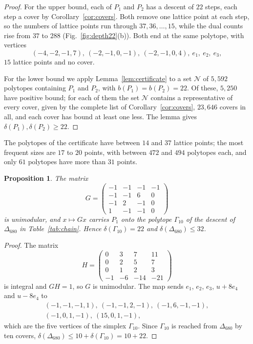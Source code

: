 \documentclass[manuscript]{aomart}
\newtheorem{proposition}[theorem]{Proposition}
\theoremstyle{definition}
\theoremstyle{remark}
\newcommand{\Dbig}{\Delta_{680}}
\begin{document}
\begin{proof}
For the upper bound, each of $P_1$ and $P_2$ has a descent of $22$ steps,
each step a cover by Corollary~\ref{cor:covers}. Both remove one lattice
point at each step, so the numbers of lattice points run through
$37,36,\dots,15$, while the dual counts rise from $37$ to $288$
(Fig.~\ref{fig:depth22}(b)). Both end at the same polytope, with vertices
\[
(-4,-2,-1,7),\ (-2,-1,0,-1),\ (-2,-1,0,4),\ e_1,\ e_2,\ e_3,
\]
$15$ lattice points and no cover.

For the lower bound we apply Lemma~\ref{lem:certificate} to a set
$\mathcal{N}$ of $5{,}592$ polytopes containing $P_1$ and $P_2$, with
$b(P_1)=b(P_2)=22$. Of these, $5{,}250$ have positive bound; for each of
them the set $\mathcal{N}$ contains a representative of every cover, given
by the complete list of Corollary~\ref{cor:covers}, $23{,}646$ covers in
all, and each cover has bound at least one less. The lemma gives
$\delta(P_1),\delta(P_2)\ge22$.
\end{proof}

The polytopes of the certificate have between $14$ and $37$ lattice
points; the most frequent sizes are $17$ to $20$ points, with between
$472$ and $494$ polytopes each, and only $61$ polytopes have more than
$31$ points.

\begin{proposition}\label{prop:gamma10}
The matrix
\[
G=\begin{pmatrix}-1&-1&-1&-1\\-1&-1&6&0\\-1&2&-1&0\\1&-1&-1&0\end{pmatrix}
\]
is unimodular, and $x\mapsto Gx$ carries $P_1$ onto the polytope
$\Gamma_{10}$ of the descent of $\Dbig$ in Table~\ref{tab:chain}. Hence
$\delta(\Gamma_{10})=22$ and $\delta(\Dbig)\le32$.
\end{proposition}

\begin{proof}
The matrix
\[
H=\begin{pmatrix}0&3&7&11\\0&2&5&7\\0&1&2&3\\-1&-6&-14&-21\end{pmatrix}
\]
is integral and $GH=1$, so $G$ is unimodular. The map sends $e_1$, $e_2$,
$e_3$, $u+8e_4$ and $u-8e_4$ to
\begin{gather*}
(-1,-1,-1,1),\ (-1,-1,2,-1),\ (-1,6,-1,-1),\\
(-1,0,1,-1),\ (15,0,1,-1),
\end{gather*}
which are the five vertices of the simplex $\Gamma_{10}$. Since
$\Gamma_{10}$ is reached from $\Dbig$ by ten covers,
$\delta(\Dbig)\le10+\delta(\Gamma_{10})=10+22$.
\end{proof}
\end{document}
